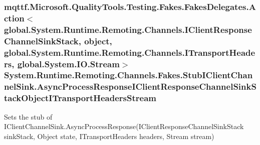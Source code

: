 \hypertarget{class_system_1_1_runtime_1_1_remoting_1_1_channels_1_1_fakes_1_1_stub_i_client_channel_sink_a4a47940d0862727c6eaf1b810406d086}{
\subsubsection[{Async\-Process\-Response\-I\-Client\-Response\-Channel\-Sink\-Stack\-Object\-I\-Transport\-Headers\-Stream}]{\setlength{\rightskip}{0pt plus 5cm}mqttf.\-Microsoft.\-Quality\-Tools.\-Testing.\-Fakes.\-Fakes\-Delegates.\-Action$<$global.\-System.\-Runtime.\-Remoting.\-Channels.\-I\-Client\-Response\-Channel\-Sink\-Stack, object, global.\-System.\-Runtime.\-Remoting.\-Channels.\-I\-Transport\-Headers, global.\-System.\-I\-O.\-Stream$>$ System.\-Runtime.\-Remoting.\-Channels.\-Fakes.\-Stub\-I\-Client\-Channel\-Sink.\-Async\-Process\-Response\-I\-Client\-Response\-Channel\-Sink\-Stack\-Object\-I\-Transport\-Headers\-Stream}}\label{class_system_1_1_runtime_1_1_remoting_1_1_channels_1_1_fakes_1_1_stub_i_client_channel_sink_a4a47940d0862727c6eaf1b810406d086}


Sets the stub of I\-Client\-Channel\-Sink.\-Async\-Process\-Response(\-I\-Client\-Response\-Channel\-Sink\-Stack sink\-Stack, Object state, I\-Transport\-Headers headers, Stream stream)

